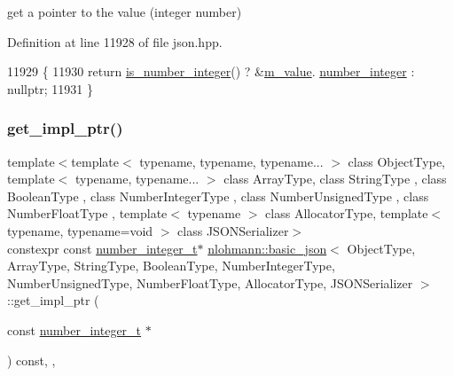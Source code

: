 get a pointer to the value (integer number) 



Definition at line 11928 of file json.\+hpp.


\begin{DoxyCode}
11929     \{
11930         \textcolor{keywordflow}{return} \hyperlink{classnlohmann_1_1basic__json_abac8af76067f1e8fdca9052882c74428}{is\_number\_integer}() ? &\hyperlink{classnlohmann_1_1basic__json_aeb0814f76966f99290cb29e127c90a77}{m\_value}.
      \hyperlink{unionnlohmann_1_1basic__json_1_1json__value_afa3c414445aeffb56a7c6926f9420941}{number\_integer} : \textcolor{keyword}{nullptr};
11931     \}
\end{DoxyCode}
\mbox{\label{classnlohmann_1_1basic__json_a0a01103792cc54e9c8236361e5f7ed90}} 
\subsubsection{\texorpdfstring{get\+\_\+impl\+\_\+ptr()}{get\_impl\_ptr()}\hspace{0.1cm}{\footnotesize\ttfamily [10/14]}}
{\footnotesize\ttfamily template$<$template$<$ typename, typename, typename... $>$ class Object\+Type, template$<$ typename, typename... $>$ class Array\+Type, class String\+Type , class Boolean\+Type , class Number\+Integer\+Type , class Number\+Unsigned\+Type , class Number\+Float\+Type , template$<$ typename $>$ class Allocator\+Type, template$<$ typename, typename=void $>$ class J\+S\+O\+N\+Serializer$>$ \\
constexpr const \hyperlink{classnlohmann_1_1basic__json_a98e611d67b7bd75307de99c9358ab2dc}{number\+\_\+integer\+\_\+t}$\ast$ \hyperlink{classnlohmann_1_1basic__json}{nlohmann\+::basic\+\_\+json}$<$ Object\+Type, Array\+Type, String\+Type, Boolean\+Type, Number\+Integer\+Type, Number\+Unsigned\+Type, Number\+Float\+Type, Allocator\+Type, J\+S\+O\+N\+Serializer $>$\+::get\+\_\+impl\+\_\+ptr (\begin{DoxyParamCaption}\item[{const \hyperlink{classnlohmann_1_1basic__json_a98e611d67b7bd75307de99c9358ab2dc}{number\+\_\+integer\+\_\+t} $\ast$}]{ }\end{DoxyParamCaption}) const\hspace{0.3cm}{\ttfamily [inline]}, {\ttfamily [private]}, {\ttfamily [noexcept]}}



